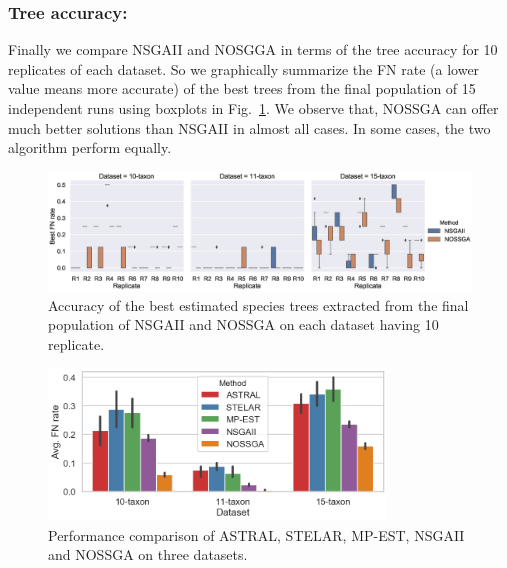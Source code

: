 \subsubsection{Tree accuracy:} Finally we compare NSGAII and NOSGGA in terms of the tree accuracy for 10 replicates of each dataset. So we graphically summarize the FN rate (a lower value means more accurate) of the best trees from the final population of 15 independent runs using boxplots in Fig.~\ref{fig:emo_compare}. We observe that, NOSSGA can offer much better solutions than NSGAII in almost all cases. In some cases, the two algorithm perform equally.
\begin{figure}
	\centering
	\begin{adjustwidth}{-2cm}{-2cm}
		\includegraphics[width=1.5\textwidth]{Figure/emo_boxplot}
		\caption{Accuracy of the best estimated species trees extracted from the final population of NSGAII and NOSSGA on each dataset having 10 replicate.} \label{fig:emo_compare}
	\end{adjustwidth}
\end{figure}

\begin{figure}
	\begin{adjustwidth}{0cm}{0cm}
		\centering
		\includegraphics[width=0.8\textwidth]{Figure/all_dataset_compare}
		\caption{Performance comparison of ASTRAL, STELAR, MP-EST, NSGAII and NOSSGA on three datasets. 
		} \label{fig:compare_exisitng_methods}
	\end{adjustwidth}
\end{figure}

